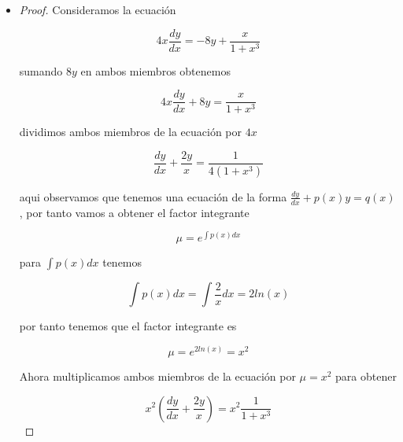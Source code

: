 \begin{itemize}
\begin{proof}
$$y\cdot e^{2x}=\int e^{2x}\frac{1}{1+e^{2x}}dx$$

por lo que obtenemos

$$y=\frac{1}{e^{2x}}\int \frac{e^{2x}}{1+e^{2x}}dx$$

resolvemos la integral tomando $u=1+e^{2x}$, obtenemos

$$y=\frac{1}{e^{2x}}\left[ln(e^{2x}+1)^{\frac{1}{2}}+C\right]$$

ahora sustituyendo los valores iniciales $y(1)=1$ para obtener la constante 

$$1=\frac{1}{e^2}\left[ln(e^2+1)^{\frac{1}{2}}+C\right]$$

despejando C obtenemos

$$C=e^2-ln(e^2+1)^{\frac{1}{2}}$$

sustituyendo obtenemos

$$y=\frac{1}{e^{2x}}\left[ln(e^{2x}+1)^{\frac{1}{2}}+e^2-ln(e^2+1)^{\frac{1}{2}}\right]$$

por tanto la solución al PVI es

$$y=\frac{e^2}{e^{2x}}=e^{2(1-x)}$$

\end{proof}

  \item \begin{proof}

Consideramos la ecuación

$$4x\frac{dy}{dx}=-8y+\frac{x}{1+x^3}$$

sumando $8y$ en ambos miembros obtenemos

$$4x\frac{dy}{dx}+8y=\frac{x}{1+x^3}$$

dividimos ambos miembros de la ecuación por $4x$

$$\frac{dy}{dx}+\frac{2y}{x}=\frac{1}{4(1+x^3)}$$

aqui observamos que tenemos una ecuación de la forma $\frac{dy}{dx}+p(x)y=q(x)$, por tanto vamos a obtener el factor integrante 

$$\mu=e^{{\int} p(x)dx}$$

para $\int p(x)dx$ tenemos

$$\int p(x)dx=\int \frac{2}{x} dx=2ln(x)$$

por tanto tenemos que el factor integrante es

$$\mu=e^{2ln(x)}=x^2$$

Ahora multiplicamos ambos miembros de la ecuación por $\mu=x^{2}$ para obtener

$$x^2(\frac{dy}{dx}+\frac{2y}{x})=x^2\frac{1}{1+x^3} $$


\end{proof}
\end{itemize}
